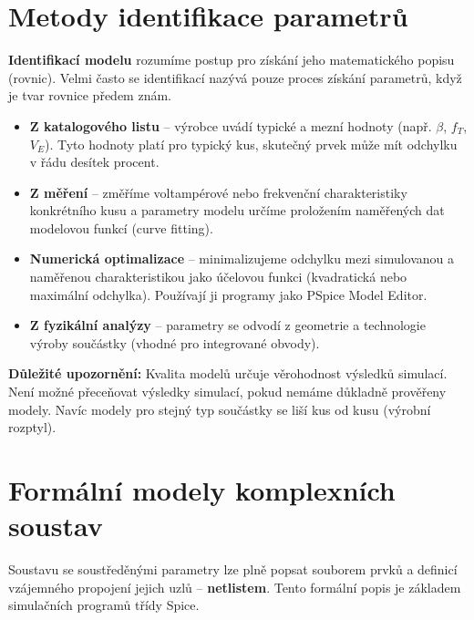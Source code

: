 \section{Metody identifikace parametrů}
\textbf{Identifikací modelu} rozumíme postup pro získání jeho matematického popisu (rovnic). Velmi často se identifikací nazývá pouze proces získání parametrů, když je tvar rovnice předem znám.

\begin{itemize}
    \item \textbf{Z katalogového listu} -- výrobce uvádí typické a mezní hodnoty (např. $\beta$, $f_T$, $V_E$). Tyto hodnoty platí pro typický kus, skutečný prvek může mít odchylku v řádu desítek procent.
    \item \textbf{Z měření} -- změříme voltampérové nebo frekvenční charakteristiky konkrétního kusu a parametry modelu určíme proložením naměřených dat modelovou funkcí (curve fitting).
    \item \textbf{Numerická optimalizace} -- minimalizujeme odchylku mezi simulovanou a naměřenou charakteristikou jako účelovou funkci (kvadratická nebo maximální odchylka). Používají ji programy jako PSpice Model Editor.
    \item \textbf{Z fyzikální analýzy} -- parametry se odvodí z geometrie a technologie výroby součástky (vhodné pro integrované obvody).
\end{itemize}
\textbf{Důležité upozornění:} Kvalita modelů určuje věrohodnost výsledků simulací. Není možné přeceňovat výsledky simulací, pokud nemáme důkladně prověřeny modely. Navíc modely pro stejný typ součástky se liší kus od kusu (výrobní rozptyl).

\section{Formální modely komplexních soustav}
Soustavu se soustředěnými parametry lze plně popsat souborem prvků a definicí vzájemného propojení jejich uzlů -- \textbf{netlistem}. Tento formální popis je základem simulačních programů třídy Spice.

